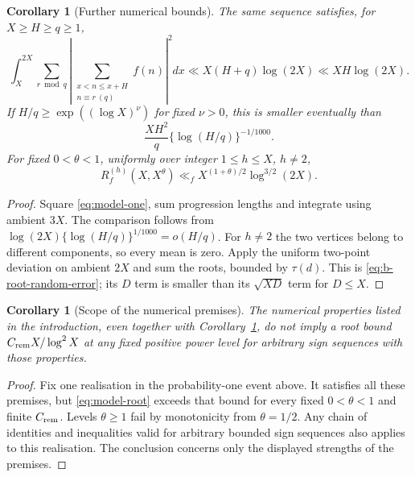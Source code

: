 \documentclass[11pt]{article}
\newtheorem{corollary}[theorem]{Corollary}
\theoremstyle{definition}
\theoremstyle{remark}
\numberwithin{equation}{section}
\begin{document}
\begin{corollary}[Further numerical bounds]\label{cor:b-numerical}
The same sequence satisfies, for $X\ge H\ge q\ge1$,
\begin{equation}\label{eq:b-variance}
 \int_X^{2X}\sum_{r\bmod q}
 \left|\sum_{\substack{x<n\le x+H\\n\equiv r\ (q)}}f(n)\right|^2dx
 \ll X(H+q)\log(2X)\ll XH\log(2X).
\end{equation}
If $H/q\ge\exp((\log X)^\nu)$ for fixed $\nu>0$, this is smaller eventually than
\begin{equation}\label{eq:b-variance-comparison}
 \frac{XH^2}{q}\{\log(H/q)\}^{-1/1000}.
\end{equation}
For fixed $0<\theta<1$, uniformly over integer $1\le h\le X$, $h\ne2$,
\begin{equation}\label{eq:b-other-shifts}
 R_f^{(h)}(X,X^\theta)\ll_fX^{(1+\theta)/2}\log^{3/2}(2X).
\end{equation}
\end{corollary}
\begin{proof}
Square \eqref{eq:model-one}, sum progression lengths and integrate using ambient $3X$.
The comparison follows from $\log(2X)\{\log(H/q)\}^{1/1000}=o(H/q)$.
For $h\ne2$ the two vertices belong to different components, so every mean is zero.
Apply the uniform two-point deviation on ambient $2X$ and sum the roots, bounded by $\tau(d)$.
This is \eqref{eq:b-root-random-error}; its $D$ term is smaller than its $\sqrt{XD}$ term for $D\le X$.
\end{proof}
\begin{corollary}[Scope of the numerical premises]\label{cor:b-scope}
The numerical properties listed in the introduction, even together with
Corollary~\ref{cor:b-numerical}, do not imply a root bound $C_{\rm rem}X/\log^2X$ at any fixed positive
power level for arbitrary sign sequences with those properties.
\end{corollary}
\begin{proof}
Fix one realisation in the probability-one event above. It satisfies all these premises, but
\eqref{eq:model-root} exceeds that bound for every fixed $0<\theta<1$ and finite $C_{\rm rem}$.
Levels $\theta\ge1$ fail by monotonicity from $\theta=1/2$. Any chain of identities and inequalities
valid for arbitrary bounded sign sequences also applies to this realisation.
The conclusion concerns only the displayed strengths of the premises.
\end{proof}
\end{document}
